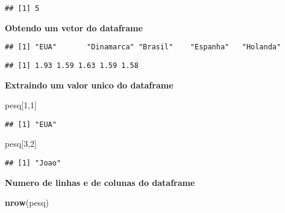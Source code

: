 \documentclass[]{article}
\newenvironment{Shaded}{\begin{snugshade}}{\end{snugshade}}
\newcommand{\KeywordTok}[1]{\textcolor[rgb]{0.13,0.29,0.53}{\textbf{#1}}}
\newcommand{\DecValTok}[1]{\textcolor[rgb]{0.00,0.00,0.81}{#1}}
\newcommand{\OperatorTok}[1]{\textcolor[rgb]{0.81,0.36,0.00}{\textbf{#1}}}
\newcommand{\NormalTok}[1]{#1}
\begin{document}
\begin{verbatim}
## [1] 5
\end{verbatim}

\textbf{Obtendo um vetor do dataframe}

\begin{Shaded}
\end{Shaded}

\begin{verbatim}
## [1] "EUA"       "Dinamarca" "Brasil"    "Espanha"   "Holanda"
\end{verbatim}

\begin{Shaded}
\end{Shaded}

\begin{verbatim}
## [1] 1.93 1.59 1.63 1.59 1.58
\end{verbatim}

\textbf{Extraindo um valor unico do dataframe}

\begin{Shaded}
\begin{Highlighting}[]
\NormalTok{pesq[}\DecValTok{1}\NormalTok{,}\DecValTok{1}\NormalTok{]}
\end{Highlighting}
\end{Shaded}

\begin{verbatim}
## [1] "EUA"
\end{verbatim}

\begin{Shaded}
\begin{Highlighting}[]
\NormalTok{pesq[}\DecValTok{3}\NormalTok{,}\DecValTok{2}\NormalTok{]}
\end{Highlighting}
\end{Shaded}

\begin{verbatim}
## [1] "Joao"
\end{verbatim}

\textbf{Numero de linhas e de colunas do dataframe}

\begin{Shaded}
\begin{Highlighting}[]
\KeywordTok{nrow}\NormalTok{(pesq)}
\end{Highlighting}
\end{Shaded}
\end{document}
